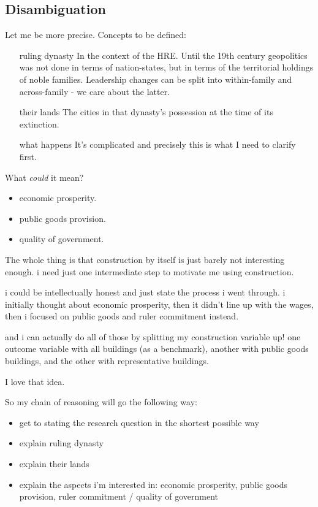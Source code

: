 \documentclass{article}
\begin{document}
\subsection{Disambiguation}
Let me be more precise. Concepts to be defined:
\begin{itemize}
    \item[ruling dynasty] In the context of the HRE. Until the 19th century geopolitics was not done in terms of nation-states, but in terms of the territorial holdings of noble families. Leadership changes can be split into within-family and across-family - we care about the latter.
    \item[their lands] The cities in that dynasty's possession at the time of its extinction.
    \item[what happens] It's complicated and precisely this is what I need to clarify first.
\end{itemize}

What \textit{could} it mean?
\begin{itemize}
    \item economic prosperity.
    \item public goods provision.
    \item quality of government.
\end{itemize}

The whole thing is that construction by itself is just barely not interesting enough. i need just one intermediate step to motivate me using construction.

i could be intellectually honest and just state the process i went through. i initially thought about economic prosperity, then it didn't line up with the wages, then i focused on public goods and ruler commitment instead.

and i can actually do all of those by splitting my construction variable up! one outcome variable with all buildings (as a benchmark), another with public goods buildings, and the other with representative buildings.

I love that idea.

So my chain of reasoning will go the following way:
\begin{itemize}
    \item get to stating the research question in the shortest possible way
    \item explain ruling dynasty
    \item explain their lands
    \item explain the aspects i'm interested in: economic prosperity, public goods provision, ruler commitment / quality of government
\end{itemize}
\end{document}
